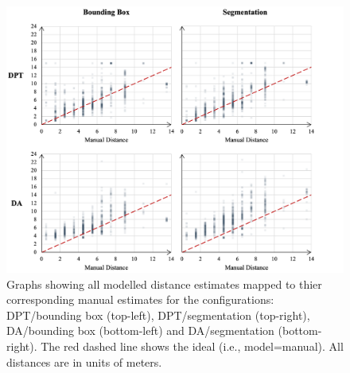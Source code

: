 \begin{figure}[p]
    \centering
    \includegraphics[width=1.01\textwidth]{body/analysis/assets/distance_graphs/spread}
    \caption{Graphs showing all modelled distance estimates mapped to thier corresponding manual
        estimates for the configurations: DPT/bounding box (top-left), DPT/segmentation (top-right),
        DA/bounding box (bottom-left) and DA/segmentation (bottom-right). The red dashed line shows
        the ideal (i.e., model=manual). All distances are in units of meters.}
    \label{fig:spread_comparison}
\end{figure}

\clearpage


